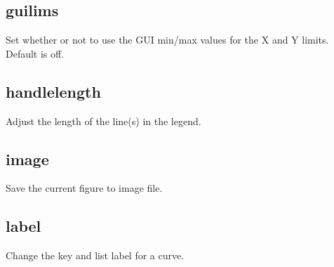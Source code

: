 \documentclass[letterpaper,10pt,english]{sphinxmanual}
\begin{document}
\subsection{guilims}
\label{\detokenize{plot_control_cmds:guilims}}
Set whether or not to use the GUI min/max values for the X and Y limits. Default is off.

\begin{sphinxVerbatim}[commandchars=\\\{\}]
\PYG{p}{[}\PYG{p}{]}    
\end{sphinxVerbatim}


\subsection{handlelength}
\label{\detokenize{plot_control_cmds:handlelength}}
Adjust the length of the line(s) in the legend.

\begin{sphinxVerbatim}[commandchars=\\\{\}]
\PYG{p}{[}\PYG{p}{]}  
\end{sphinxVerbatim}


\subsection{image}
\label{\detokenize{plot_control_cmds:image}}
Save the current figure to image file.

\begin{sphinxVerbatim}[commandchars=\\\{\}]
\PYG{p}{[}\PYG{p}{]}          
\end{sphinxVerbatim}


\subsection{label}
\label{\detokenize{plot_control_cmds:label}}
Change the key and list label for a curve.

\begin{sphinxVerbatim}[commandchars=\\\{\}]
\PYG{p}{[}\PYG{p}{]}   
\end{sphinxVerbatim}
\end{document}
